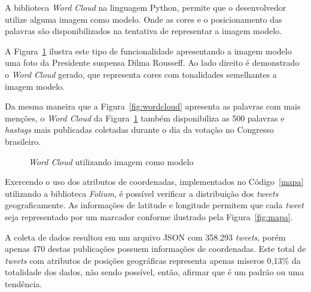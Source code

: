 A biblioteca \textit{Word Cloud} na linguagem Python, permite que o desenvolvedor utilize alguma imagem como modelo. Onde as cores e o posicionamento das palavras são disponibilizados na tentativa de representar a imagem modelo.

A Figura~\ref{fig:worddilma} ilustra este tipo de funcionalidade apresentando a imagem modelo uma foto da Presidente suspensa Dilma Rousseff. Ao lado direito é demonstrado o \textit{Word Cloud} gerado, que representa cores com tonalidades semelhantes a imagem modelo.

Da mesma maneira que a Figura~\ref{fig:wordcloud} apresenta as palavras com mais menções, o \textit{Word Cloud} da Figura~\ref{fig:worddilma} também disponibiliza as 500 palavras e \textit{hastags} mais publicadas coletadas durante o dia da votação no Congresso brasileiro.

\begin{figure}[h]
	\centering
	\vspace{-0.2cm}
	\caption{\textit{Word Cloud} utilizando imagem como modelo}
	\label{fig:worddilma}
\end{figure}

Exercendo o uso dos atributos de coordenadas, implementados no Código~\ref{mapa} utilizando a biblioteca \textit{Folium}, é possível verificar a distribuição dos \textit{tweets} geograficamente. As informações de latitude e longitude permitem que cada \textit{tweet} seja representado por um marcador conforme ilustrado pela Figura~\ref{fig:mapa}.

A coleta de dados resultou em um arquivo JSON com 358.293 \textit{tweets}, porém apenas 470 destas publicações possuem informações de coordenadas. Este total de \textit{tweets} com atributos de posições geográficas representa apenas míseros 0,13\% da totalidade dos dados, não sendo possível, então, afirmar que é um padrão ou uma tendência.

